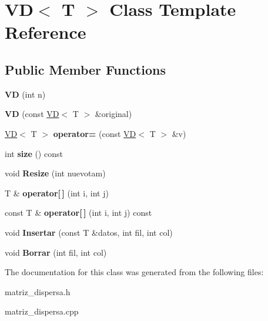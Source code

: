 \hypertarget{classVD}{}\section{VD$<$ T $>$ Class Template Reference}
\label{classVD}
\subsection*{Public Member Functions}
\begin{DoxyCompactItemize}
\item 
{\bfseries VD} (int n)\hypertarget{classVD_a3e306c94d24b4ca50da4e0760b4f1d9b}{}\label{classVD_a3e306c94d24b4ca50da4e0760b4f1d9b}

\item 
{\bfseries VD} (const \hyperlink{classVD}{VD}$<$ T $>$ \&original)\hypertarget{classVD_a4f22b92dd8ace25d50311ccd61508dfc}{}\label{classVD_a4f22b92dd8ace25d50311ccd61508dfc}

\item 
\hyperlink{classVD}{VD}$<$ T $>$ {\bfseries operator=} (const \hyperlink{classVD}{VD}$<$ T $>$ \&v)\hypertarget{classVD_a645b65a6343059cd921f6a2856c97249}{}\label{classVD_a645b65a6343059cd921f6a2856c97249}

\item 
int {\bfseries size} () const \hypertarget{classVD_aa9a7ad003d6b587b8b686e7ec788c88b}{}\label{classVD_aa9a7ad003d6b587b8b686e7ec788c88b}

\item 
void {\bfseries Resize} (int nuevotam)\hypertarget{classVD_ab6c9c02a75b5a8a4ebacf02ea520166e}{}\label{classVD_ab6c9c02a75b5a8a4ebacf02ea520166e}

\item 
T \& {\bfseries operator\mbox{[}$\,$\mbox{]}} (int i, int j)\hypertarget{classVD_a1810736a53302315cf8b1a4c7cfe2b0d}{}\label{classVD_a1810736a53302315cf8b1a4c7cfe2b0d}

\item 
const T \& {\bfseries operator\mbox{[}$\,$\mbox{]}} (int i, int j) const \hypertarget{classVD_ab1e059b196822721c042a76b22b9dafc}{}\label{classVD_ab1e059b196822721c042a76b22b9dafc}

\item 
void {\bfseries Insertar} (const T \&datos, int fil, int col)\hypertarget{classVD_a8c989c85a967f15490700e1c51286f6b}{}\label{classVD_a8c989c85a967f15490700e1c51286f6b}

\item 
void {\bfseries Borrar} (int fil, int col)\hypertarget{classVD_a5e9bc5567841582997962f91226a673e}{}\label{classVD_a5e9bc5567841582997962f91226a673e}

\end{DoxyCompactItemize}


The documentation for this class was generated from the following files\+:\begin{DoxyCompactItemize}
\item 
matriz\+\_\+dispersa.\+h\item 
matriz\+\_\+dispersa.\+cpp\end{DoxyCompactItemize}
